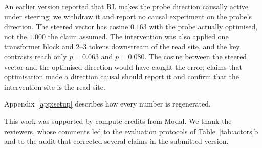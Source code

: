 \documentclass{article}
\begin{document}
An earlier version reported that RL makes the probe direction causally active under steering; we withdraw it and report no causal experiment on the probe's direction. The steered vector has cosine $0.163$ with the probe actually optimised, not the $1.000$ the claim assumed. The intervention was also applied one transformer block and 2--3 tokens downstream of the read site, and the key contrasts reach only $p=0.063$ and $p=0.080$. The cosine between the steered vector and the optimised direction would have caught the error; claims that optimisation made a direction causal should report it and confirm that the intervention site is the read site.

Appendix~\ref{app:setup} describes how every number is regenerated.

\begin{ack}
This work was supported by compute credits from Modal. We thank the reviewers, whose comments led to the evaluation protocols of Table~\ref{tab:actors}b and to the audit that corrected several claims in the submitted version.
\end{ack}
\end{document}
